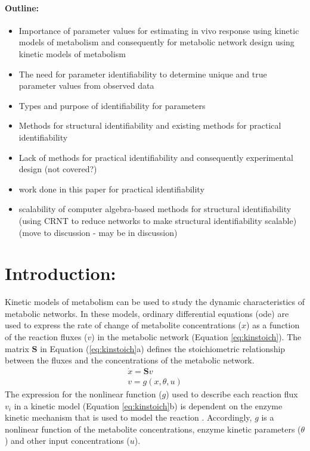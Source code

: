 \documentclass[10pt]{article}
\begin{document}
\paragraph{Outline:}
\begin{itemize}
	\item Importance of parameter values for estimating in vivo response using kinetic models of metabolism and consequently for metabolic network design using kinetic models of metabolism
	\item The need for parameter identifiability to determine unique and true parameter values from observed data
	\item Types and purpose of identifiability for parameters
	\item Methods for structural identifiability and existing methods for practical identifiability
	\item Lack of methods for practical identifiability and consequently experimental design (not covered?)
	\item work done in this paper for practical identifiability			
	\item scalability of computer algebra-based methods for structural identifiability (using CRNT to reduce networks to make structural identifiability scalable) (move to discussion - may be in discussion)
\end{itemize}
\section{Introduction:}
Kinetic models of metabolism can be used to study the dynamic characteristics of metabolic networks. In these models, ordinary differential equations (ode) are used to express the rate of change of metabolite concentrations ($x$) as a function of the reaction fluxes ($v$) in the metabolic network (Equation \ref{eq:kinstoich}). The matrix $\mathbf{S}$ in Equation (\ref{eq:kinstoich}a) defines the stoichiometric relationship between the fluxes and the concentrations of the metabolic network.
\begin{subequations}\label{eq:kinstoich}
	\begin{align}
	\dot{x} = \mathbf{S}v\\
	v = g(x, \theta, u)
	\end{align}
\end{subequations}
The expression for the nonlinear function ($g$) used to describe each reaction flux $v_i$ in a kinetic model (Equation \ref{eq:kinstoich}b) is dependent on the enzyme kinetic mechanism that is used to model the reaction \parencite{Heijnen2005, Link2014, Machado2011, Srinivasan2015}. Accordingly, $g$ is a nonlinear function of the metabolite concentrations, enzyme kinetic parameters ($\theta$) and other input concentrations ($u$). 
\end{document}
